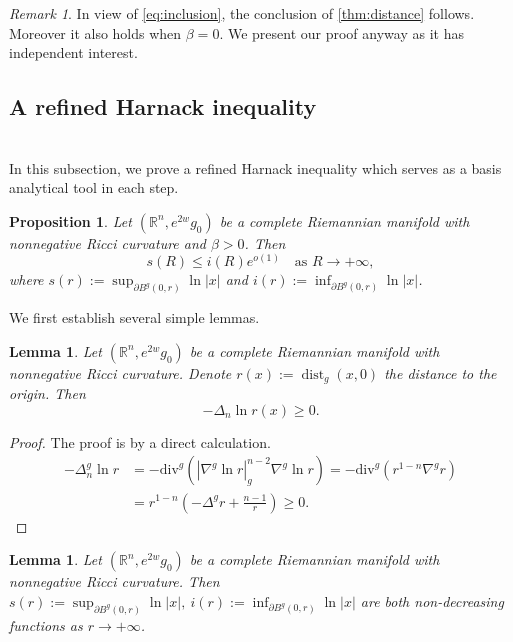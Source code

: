 \documentclass[12pt]{amsart}
\theoremstyle{plain}
\newtheorem{proposition}[theorem]{Proposition}
\newtheorem{lemma}[theorem]{Lemma}
\theoremstyle{definition}
\theoremstyle{remark}     %
\newtheorem{remark}[theorem]{Remark}
\numberwithin{equation}{section}
\newcommand{\nablag}{\nabla^g} %
\begin{document}
\begin{remark}
In view of \cref{eq:inclusion}, the conclusion of \cref{thm:distance} follows. Moreover it also holds when $\beta=0$. We present our proof anyway as it has independent interest. 
\end{remark}

\subsection{A refined Harnack inequality}
 \ \\
In this subsection, we prove a refined Harnack inequality which serves as a basis analytical tool in each step.

\begin{proposition}\label{proposition. Harnack ineq.}
    Let $(\mathbb{R}^n,e^{2w}g_0)$ be a complete Riemannian manifold with nonnegative Ricci curvature and $\beta>0$.
    Then 
    \[
        s(R)\leq i(R) e^{o(1)} \quad \text{as }R\to +\infty,
    \]
    where $s(r):=\sup_{\partial B^g(0,r) }\ln |x| $ and $i(r):=\inf_{\partial B^g(0,r)}\ln |x| $.
\end{proposition}

We first establish several simple lemmas.  
\begin{lemma}
     Let $(\mathbb{R}^n,e^{2w}g_0)$ be a complete Riemannian manifold with nonnegative Ricci curvature. Denote $r(x):=\operatorname{dist}_g(x,0)$ the distance to the origin.
     Then 
     \[
         -\Delta_n \ln r(x)\geq 0.
     \]
\end{lemma}
\begin{proof}
    The proof is by a direct calculation.
    \begin{align*}
        -\Delta_n^g \ln r
        &=-\mathrm{div}^g
        (|\nabla^g \ln r|_g^{n-2}\nablag \ln r)
        =-\mathrm{div}^g(r^{1-n}\nablag r)\\
        &=r^{1-n}\left(-\Delta^g r+\frac{n-1}{r}\right)\geq 0.
    \end{align*}
\end{proof}

\begin{lemma}\label{lemma. nondecreasing of i(r)}
    Let $(\mathbb{R}^n,e^{2w}g_0)$ be a complete Riemannian manifold with nonnegative Ricci curvature. 
     Then  $s(r):=\sup_{\partial B^g(0,r)}\ln |x|,\   i(r):=\inf_{\partial B^g(0,r)}\ln |x|$ are both non-decreasing functions as $r\to +\infty$.
\end{lemma}
\end{document}

